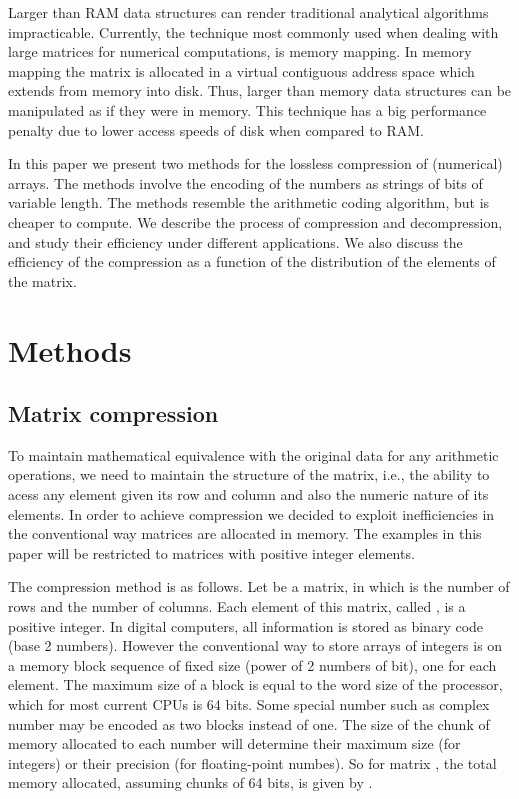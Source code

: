 \documentclass[10pt]{article}
\begin{document}
Larger than RAM data structures can render traditional analytical algorithms impracticable. Currently, the technique most commonly used when dealing with large matrices for numerical computations, is memory mapping\cite{van2011numpy,big}. In memory mapping the matrix is allocated in a virtual contiguous address space which extends from memory into disk. Thus, larger than memory data structures can be manipulated as if they were in memory.  This technique has a big performance penalty due to lower access speeds of disk when compared to RAM. 

In this paper we present two methods for the lossless compression of (numerical) arrays. The methods involve the encoding of the numbers as strings of bits of variable length. The methods resemble the arithmetic coding\cite{bodden2007arithmetic} algorithm, but is cheaper to compute. We describe the process of compression and decompression, and study their efficiency under different applications. We also discuss the efficiency of the compression as a function of the distribution of the elements of the matrix. 

\section*{Methods}

\subsection*{Matrix compression}

To maintain mathematical equivalence with the original data for any arithmetic operations, we need to  maintain the structure of the matrix, i.e., the ability to acess any element given its row  and column  and also the numeric nature of its elements. In order to achieve compression we decided to exploit inefficiencies in the conventional way matrices are allocated in memory. The examples in this paper will be restricted to matrices with positive integer elements.

The compression method is as follows. Let  be a matrix, in which  is the number of rows and  the number of columns. Each element of this matrix, called , is a positive integer. In digital computers, all information is stored as binary code (base 2 numbers). However the conventional way to store arrays of integers is on a memory block sequence of fixed size (power of 2 numbers of bit), one for each element. The maximum size of a block is equal to the word size of the processor, which for most current CPUs is 64 bits. Some special number such as complex number may be encoded as two blocks instead of one. The size of the chunk of memory allocated to each number will determine their maximum  size (for integers) or their precision (for floating-point numbes). So for matrix , the total memory allocated, assuming chunks of 64 bits, is given by .
\end{document}
